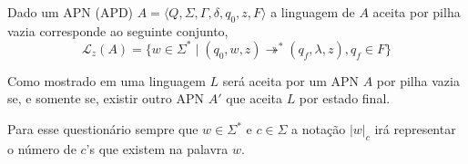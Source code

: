 \begin{definition}
    Dado um APN (APD) $A = \langle Q, \Sigma, \Gamma, \delta, q_0, z, F\rangle$ a linguagem de $A$ aceita por pilha vazia corresponde ao seguinte conjunto, 
    \begin{equation}
        \mathcal{L}_{z}(A) = \{w \in \Sigma^* \mid (q_0, w, z) \twoheadrightarrow^* (q_f, \lambda, z), q_f \in F\}
    \end{equation}
\end{definition}

Como mostrado em \cite{hopcroft2008} uma linguagem $L$ será aceita por um APN $A$ por pilha vazia se, e somente se, existir outro APN $A'$ que aceita $L$ por estado final.

\begin{remark}
	Para esse questionário sempre que $w \in \Sigma^*$ e $c \in \Sigma$ a notação $|w|_c$ irá representar o número de $c$'s que existem na palavra $w$.
\end{remark}


